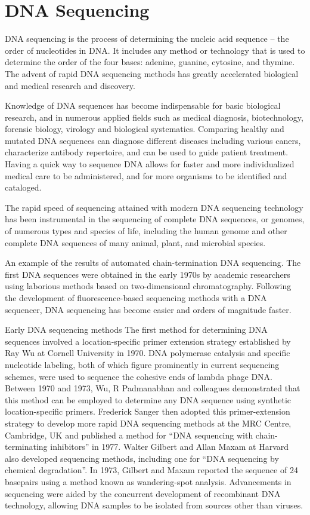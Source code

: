 \hypertarget{dna-sequencing}{%
\section{DNA Sequencing}\label{dna-sequencing}}

DNA sequencing is the process of determining the nucleic acid sequence -- the order of nucleotides in DNA. It includes any method or technology that is used to determine the order of the four bases: adenine, guanine, cytosine, and thymine. The advent of rapid DNA sequencing methods has greatly accelerated biological and medical research and discovery.

Knowledge of DNA sequences has become indispensable for basic biological research, and in numerous applied fields such as medical diagnosis, biotechnology, forensic biology, virology and biological systematics. Comparing healthy and mutated DNA sequences can diagnose different diseases including various caners, characterize antibody repertoire, and can be used to guide patient treatment. Having a quick way to sequence DNA allows for faster and more individualized medical care to be administered, and for more organisms to be identified and cataloged.

The rapid speed of sequencing attained with modern DNA sequencing technology has been instrumental in the sequencing of complete DNA sequences, or genomes, of numerous types and species of life, including the human genome and other complete DNA sequences of many animal, plant, and microbial species.

An example of the results of automated chain-termination DNA sequencing.
The first DNA sequences were obtained in the early 1970s by academic researchers using laborious methods based on two-dimensional chromatography. Following the development of fluorescence-based sequencing methods with a DNA sequencer, DNA sequencing has become easier and orders of magnitude faster.

Early DNA sequencing methods
The first method for determining DNA sequences involved a location-specific primer extension strategy established by Ray Wu at Cornell University in 1970. DNA polymerase catalysis and specific nucleotide labeling, both of which figure prominently in current sequencing schemes, were used to sequence the cohesive ends of lambda phage DNA. Between 1970 and 1973, Wu, R Padmanabhan and colleagues demonstrated that this method can be employed to determine any DNA sequence using synthetic location-specific primers. Frederick Sanger then adopted this primer-extension strategy to develop more rapid DNA sequencing methods at the MRC Centre, Cambridge, UK and published a method for ``DNA sequencing with chain-terminating inhibitors'' in 1977. Walter Gilbert and Allan Maxam at Harvard also developed sequencing methods, including one for ``DNA sequencing by chemical degradation''. In 1973, Gilbert and Maxam reported the sequence of 24 basepairs using a method known as wandering-spot analysis. Advancements in sequencing were aided by the concurrent development of recombinant DNA technology, allowing DNA samples to be isolated from sources other than viruses.

